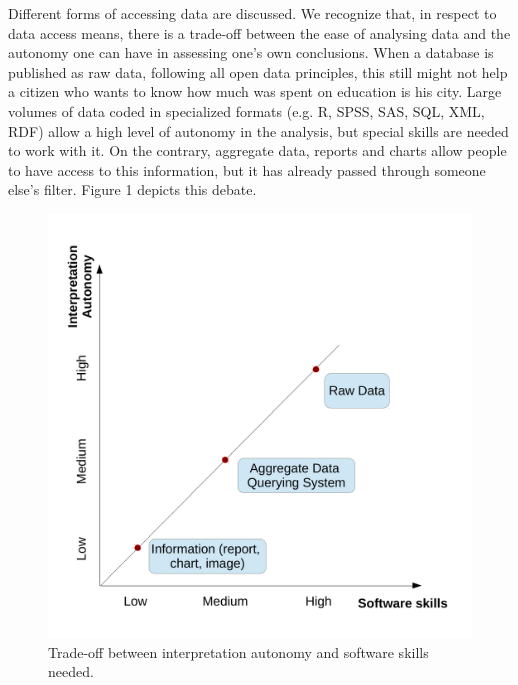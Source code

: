 Different forms of accessing data are discussed. We recognize that, in respect to data access means, there is a trade-off between the ease of analysing data and the autonomy one can have in assessing one’s own conclusions. When a database is published as raw data, following all open data principles, this still might not help a citizen who wants to know how much was spent on education is his city. Large volumes of data coded in specialized formats (e.g. R, SPSS, SAS, SQL, XML, RDF) allow a high level of autonomy in the analysis, but special skills are needed to work with it. On the contrary, aggregate data, reports and charts allow people to have access to this information, but it has already passed through someone else's filter. Figure 1 depicts this debate. 

\begin{figure}[h!]
\begin{center}
\includegraphics[width=\columnwidth]{images/opendatatradeoff.pdf}
\caption{Trade-off between interpretation autonomy and software skills needed.}
\label{fig:opendatatradeoff}
\end{center}
\end{figure}

